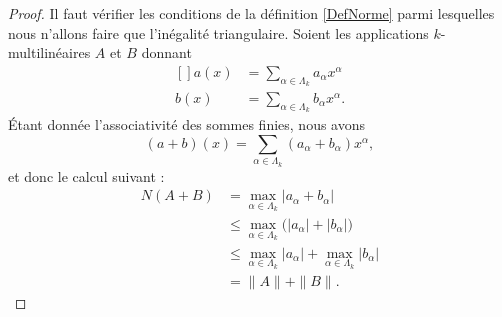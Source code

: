 \begin{proof}
	Il faut vérifier les conditions de la définition \ref{DefNorme} parmi lesquelles nous n'allons faire que l'inégalité triangulaire. Soient les applications \( k\)-multilinéaires \( A\) et \( B\) donnant
	\begin{equation}
		\begin{aligned}[]
			a(x) & =\sum_{\alpha\in\Lambda_k}a_{\alpha}x^{\alpha}  \\
			b(x) & =\sum_{\alpha\in\Lambda_k}b_{\alpha}x^{\alpha}.
		\end{aligned}
	\end{equation}
	Étant donnée l'associativité des sommes finies, nous avons
	\begin{equation}
		(a+b)(x)=\sum_{\alpha\in\Lambda_k}(a_{\alpha}+b_{\alpha})x^{\alpha},
	\end{equation}
	et donc le calcul suivant :
	\begin{subequations}
		\begin{align}
			N(A+B) & =\max_{\alpha\in\Lambda_k}| a_{\alpha}+b_{\alpha} |                                  \\
			       & \leq\max_{\alpha\in\Lambda_k}\big( | a_{\alpha} |+| b_{\alpha} | \big)               \\
			       & \leq \max_{\alpha\in\Lambda_k}| a_{\alpha} |+\max_{\alpha\in\Lambda_k}| b_{\alpha} | \\
			       & =\| A \|+\| B \|.
		\end{align}
	\end{subequations}
\end{proof}
